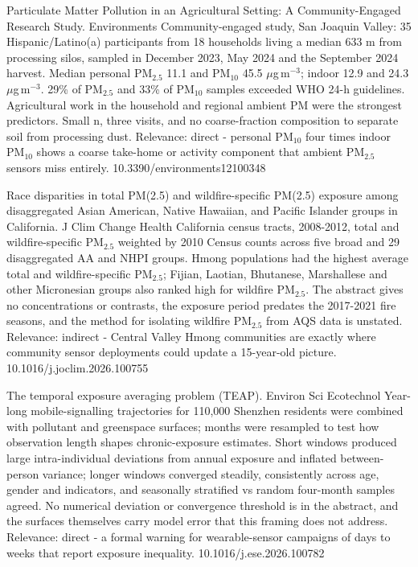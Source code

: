 \documentclass[10pt]{article}
\begin{document}
\par{}\baselineskip{}\baselineskip
{}

{Particulate Matter Pollution in an Agricultural Setting: A Community-Engaged Research Study.}
{Environments}
{Community-engaged study, San Joaquin Valley: 35 Hispanic/Latino(a) participants from 18 households living a median 633 m from processing silos, sampled in December 2023, May 2024 and the September 2024 harvest. Median personal PM$_{2.5}$ 11.1 and PM$_{10}$ 45.5 $\mu$g\,m$^{-3}$; indoor 12.9 and 24.3 $\mu$g\,m$^{-3}$. 29\% of PM$_{2.5}$ and 33\% of PM$_{10}$ samples exceeded WHO 24-h guidelines. Agricultural work in the household and regional ambient PM were the strongest predictors. Small n, three visits, and no coarse-fraction composition to separate soil from processing dust. Relevance: direct - personal PM$_{10}$ four times indoor PM$_{10}$ shows a coarse take-home or activity component that ambient PM$_{2.5}$ sensors miss entirely.}
{10.3390/environments12100348}

{Race disparities in total PM(2.5) and wildfire-specific PM(2.5) exposure among disaggregated Asian American, Native Hawaiian, and Pacific Islander groups in California.}
{J Clim Change Health}
{California census tracts, 2008-2012, total and wildfire-specific PM$_{2.5}$ weighted by 2010 Census counts across five broad and 29 disaggregated AA and NHPI groups. Hmong populations had the highest average total and wildfire-specific PM$_{2.5}$; Fijian, Laotian, Bhutanese, Marshallese and other Micronesian groups also ranked high for wildfire PM$_{2.5}$. The abstract gives no concentrations or contrasts, the exposure period predates the 2017-2021 fire seasons, and the method for isolating wildfire PM$_{2.5}$ from AQS data is unstated. Relevance: indirect - Central Valley Hmong communities are exactly where community sensor deployments could update a 15-year-old picture.}
{10.1016/j.joclim.2026.100755}

{The temporal exposure averaging problem (TEAP).}
{Environ Sci Ecotechnol}
{Year-long mobile-signalling trajectories for 110,000 Shenzhen residents were combined with pollutant and greenspace surfaces; months were resampled to test how observation length shapes chronic-exposure estimates. Short windows produced large intra-individual deviations from annual exposure and inflated between-person variance; longer windows converged steadily, consistently across age, gender and indicators, and seasonally stratified vs random four-month samples agreed. No numerical deviation or convergence threshold is in the abstract, and the surfaces themselves carry model error that this framing does not address. Relevance: direct - a formal warning for wearable-sensor campaigns of days to weeks that report exposure inequality.}
{10.1016/j.ese.2026.100782}
\end{document}
